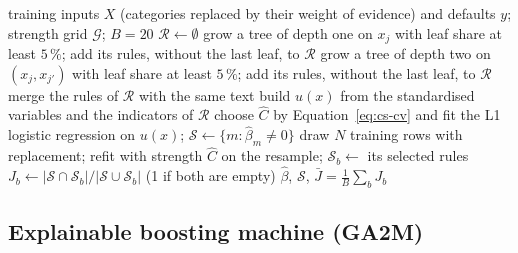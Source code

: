 \begin{algorithm}[htbp]
\caption{Fit of the penalised logistic tree regression and the stability of its rule set}
\label{alg:cs-pltr}
\begin{algorithmic}[1]
\Require training inputs $X$ (categories replaced by their weight of evidence) and defaults $y$; strength grid $\mathcal{G}$; $B=20$
\State $\mathcal{R}\gets\emptyset$
 \State grow a tree of depth one on $x_j$ with leaf share at least $5\,\%$; add its rules, without the last leaf, to $\mathcal{R}$ \EndFor
{} \State grow a tree of depth two on $(x_j,x_{j'})$ with leaf share at least $5\,\%$; add its rules, without the last leaf, to $\mathcal{R}$ \EndFor
\State merge the rules of $\mathcal{R}$ with the same text
\State build $u(x)$ from the standardised variables and the indicators of $\mathcal{R}$
\State choose $\hat C$ by Equation~\eqref{eq:cs-cv} and fit the L1 logistic regression on $u(x)$; $\mathcal{S}\gets\{m:\hat\beta_m\neq0\}$
  \State draw $N$ training rows with replacement; refit with strength $\hat C$ on the resample; $\mathcal{S}_b\gets$ its selected rules
  \State $J_b\gets|\mathcal{S}\cap\mathcal{S}_b|/|\mathcal{S}\cup\mathcal{S}_b|$ (1 if both are empty)
\EndFor
\State \Return $\hat\beta$, $\mathcal{S}$, $\bar J=\frac1B\sum_b J_b$
\end{algorithmic}
\end{algorithm}

\subsection{Explainable boosting machine (GA2M)}
\label{sec:m4}

